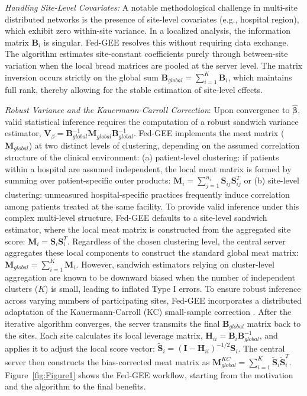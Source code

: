 \documentclass[useAMS,referee, usegraphicx]{biom}
\begin{document}
\emph{Handling Site-Level Covariates:} A notable methodological challenge in multi-site distributed networks is the presence of site-level covariates (e.g., hospital region), which exhibit zero within-site variance. In a  localized analysis, the information matrix $\mathbf{B}_i$ is singular. Fed-GEE resolves this without requiring data exchange. The algorithm estimates site-constant coefficients   purely through between-site variation when the local bread matrices are pooled at the server level. The matrix inversion occurs strictly on the global sum $\mathbf{B}_{global} = \sum_{i=1}^K \mathbf{B}_i$, which maintains full rank, thereby allowing for the stable estimation of site-level effects.

\emph{Robust Variance and the Kauermann-Carroll Correction}: Upon convergence to $\hat{\boldsymbol{\beta}}$, valid statistical inference requires the computation of a robust sandwich variance estimator, $\mathbf{V}_{\beta} = \mathbf{B}_{global}^{-1} \mathbf{M}_{global} \mathbf{B}_{global}^{-1}$. Fed-GEE implements the meat matrix ($\mathbf{M}_{global}$) at two distinct levels of clustering, depending on the assumed correlation structure of the clinical environment: (a) patient-level clustering: if patients within a hospital are assumed independent, the local meat matrix is formed by summing over patient-specific outer products: $\mathbf{M}_i = \sum_{j=1}^{n_i} \mathbf{S}_{ij} \mathbf{S}_{ij}^T$ or (b) site-level clustering: unmeasured hospital-specific practices frequently induce correlation among patients treated at the same facility. To provide valid inference under this complex multi-level structure, Fed-GEE defaults to a site-level sandwich estimator, where the local meat matrix is constructed from the aggregated site score: $\mathbf{M}_i = \mathbf{S}_i \mathbf{S}_i^T$. Regardless of the chosen clustering level, the central server aggregates these local components to construct the standard global meat matrix: $\mathbf{M}_{global} = \sum_{i=1}^K \mathbf{M}_i$. However, sandwich estimators relying on cluster-level aggregation  are known to be downward biased when the number of independent clusters ($K$) is small, leading to inflated Type I errors. To ensure robust inference across varying numbers of participating sites, Fed-GEE incorporates a distributed adaptation of the {Kauermann-Carroll (KC)} small-sample correction \citep{kauermann2001note}.  After the iterative algorithm converges, the server transmits the final $\mathbf{B}_{global}$ matrix back to the sites. Each site calculates its local leverage matrix, $\mathbf{H}_{ii} = \mathbf{B}_i \mathbf{B}_{global}^{-1}$, and applies it to adjust the local score vector: $\widetilde{\mathbf{S}}_i = (\mathbf{I} - \mathbf{H}_{ii})^{-1/2} \mathbf{S}_i
$. The central server then constructs the bias-corrected meat matrix as $\mathbf{M}_{global}^{KC} = \sum_{i=1}^K \widetilde{\mathbf{S}}_i \widetilde{\mathbf{S}}_i^T$. Figure~\ref{fig:Figure1} shows the Fed-GEE workflow, starting from the motivation and the algorithm to the final benefits.
\end{document}
